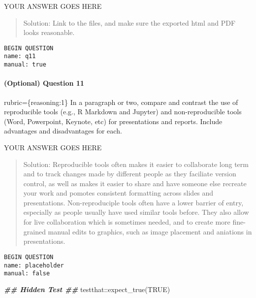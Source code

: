\documentclass[
]{article}
\newenvironment{Shaded}{\begin{snugshade}}{\end{snugshade}}
\newcommand{\ConstantTok}[1]{\textcolor[rgb]{0.00,0.00,0.00}{#1}}
\newcommand{\DocumentationTok}[1]{\textcolor[rgb]{0.56,0.35,0.01}{\textbf{\textit{#1}}}}
\newcommand{\FunctionTok}[1]{\textcolor[rgb]{0.00,0.00,0.00}{#1}}
\newcommand{\NormalTok}[1]{#1}
\newcommand{\SpecialCharTok}[1]{\textcolor[rgb]{0.00,0.00,0.00}{#1}}
\begin{document}
YOUR ANSWER GOES HERE

\begin{quote}
Solution: Link to the files, and make sure the exported html and PDF
looks reasonable.
\end{quote}

\begin{verbatim}
BEGIN QUESTION
name: q11
manual: true
\end{verbatim}

\begin{alert alert-info}
\hypertarget{optional-question-11}{%
\paragraph{(Optional) Question 11}\label{optional-question-11}}

rubric=\{reasoning:1\} In a paragraph or two, compare and contrast the
use of reproducible tools (e.g., R Markdown and Jupyter) and
non-reproducible tools (Word, Powerpoint, Keynote, etc) for
presentations and reports. Include advantages and disadvantages for
each.
\end{alert alert-info}

YOUR ANSWER GOES HERE

\begin{quote}
Solution: Reproducible tools often makes it easier to collaborate long
term and to track changes made by different people as they faciliate
version control, as well as makes it easier to share and have someone
else recreate your work and pomotes consistent formatting across slides
and presentations. Non-reproduciple tools often have a lower barrier of
entry, especially as people usually have used similar tools before. They
also allow for live collaboration which is sometimes needed, and to
create more fine-grained manual edits to graphics, such as image
placement and aniations in presentations.
\end{quote}

\begin{verbatim}
BEGIN QUESTION
name: placeholder
manual: false
\end{verbatim}

\begin{Shaded}
\begin{Highlighting}[]
\DocumentationTok{\#\# Hidden Test \#\#}
\NormalTok{testthat}\SpecialCharTok{::}\FunctionTok{expect\_true}\NormalTok{(}\ConstantTok{TRUE}\NormalTok{)}
\end{Highlighting}
\end{Shaded}
\end{document}
